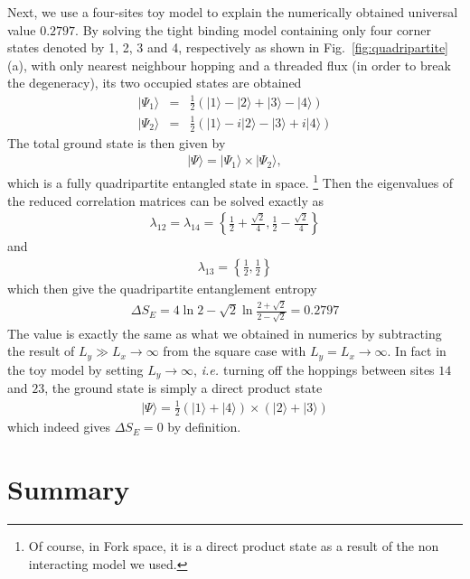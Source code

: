 \documentclass[twocolumn,superscriptaddress]{revtex4-1}
\newcommand{\ie}{\textit{i.e.{ }}}
\begin{document}
Next, we use a four-sites toy model to explain the numerically obtained universal value $0.2797$. By solving the tight binding model containing only four corner states denoted by 1, 2, 3 and 4, respectively as shown in Fig.~\ref{fig:quadripartite}(a), with only nearest neighbour hopping and a threaded flux (in order to break the degeneracy), \cite{Benalcazar_S_2017} its two occupied states are obtained 
\begin{eqnarray}
  |\Psi_1\rangle&=&\frac12\left(|1\rangle-|2\rangle+|3\rangle-|4\rangle\right) \nonumber\\
  |\Psi_2\rangle&=&\frac12\left(|1\rangle-i|2\rangle-|3\rangle+i|4\rangle\right) \nonumber
\end{eqnarray}
The total ground state is then given by
\begin{eqnarray}
  |\Psi\rangle=|\Psi_1\rangle \times |\Psi_2\rangle,
\end{eqnarray}
which is a fully quadripartite entangled state in space. \footnote{Of course, in Fork space, it is a direct product state as a result of the non interacting model we used.} Then the eigenvalues of the reduced correlation matrices can be solved exactly as
\begin{eqnarray}
  \lambda_{12}=\lambda_{14}=\left\{\frac{1}{2}+\frac{\sqrt{2}}{4},\frac{1}{2}-\frac{\sqrt{2}}{4}\right\} \nonumber
\end{eqnarray}
and
\begin{eqnarray}
  \lambda_{13}=\left\{\frac{1}{2},\frac{1}{2}\right\} \nonumber
\end{eqnarray}
which then give the quadripartite entanglement entropy
\begin{eqnarray}
  \Delta S_E= 4\ln2-\sqrt{2}\ln\frac{2+\sqrt{2}}{2-\sqrt{2}}=0.2797
\end{eqnarray}
The value is exactly the same as what we obtained in numerics by subtracting the result of $L_y\gg L_x\rightarrow\infty$ from the square case with $L_y=L_x\rightarrow\infty$. In fact in the toy model by setting $L_y\rightarrow\infty$, \ie turning off the hoppings between sites $14$ and
$23$, the ground state is simply a direct product state
\begin{eqnarray}
  |\Psi\rangle=\frac12 \left(|1\rangle+|4\rangle\right) \times \left(|2\rangle+|3\rangle\right)
\end{eqnarray}
which indeed gives $\Delta S_E=0$ by definition. 

\section{Summary}
\end{document}

